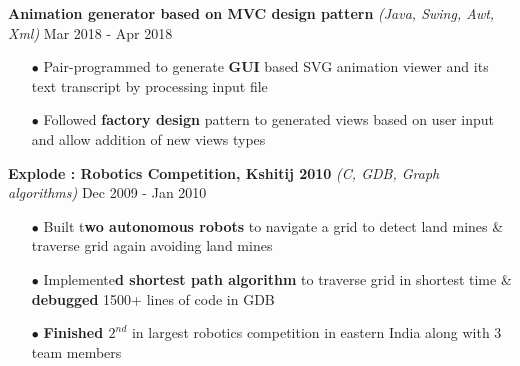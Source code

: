 \documentclass[a4paper, 10pt, oneside]{article}
\newcommand{\bulltetspace}{\vspace{-0.2em}}
\begin{document}
\begin{center}
\color{headings}\textbf{Animation generator based on MVC design pattern} \textit{(Java, Swing, Awt, Xml)} \hfill Mar 2018 - Apr 2018
\color{text1}
\vspace{-0.3em}
\begin{itemize}
\bulltetspace
\item[$\bullet$] Pair-programmed to generate \textbf{GUI} based SVG animation viewer and its text transcript by processing input file\\
\bulltetspace
\item[$\bullet$] Followed \textbf{factory design} pattern to generated views based on user input and allow addition of new views types
\vspace{0.0em}
\end{itemize}



\color{headings}\textbf{Explode : Robotics Competition, Kshitij 2010} \textit{(C, GDB, Graph algorithms)} \hfill Dec 2009 - Jan 2010
\color{text1}
\vspace{-0.3em}
\begin{itemize}
\bulltetspace
\item[$\bullet$] Built t\textbf{wo autonomous robots} to navigate a grid to detect land mines \& traverse grid again avoiding land mines\\
\bulltetspace
\item[$\bullet$] Implemente\textbf{d shortest path algorithm} to traverse grid in shortest time \& \textbf{debugged} 1500+ lines of code in GDB \\
\bulltetspace
\item[$\bullet$] \textbf{Finished $2^{nd}$} in largest robotics competition in eastern India along with 3 team members
\vspace{0.0em}
\end {itemize}
\end{center}
\end{document}
